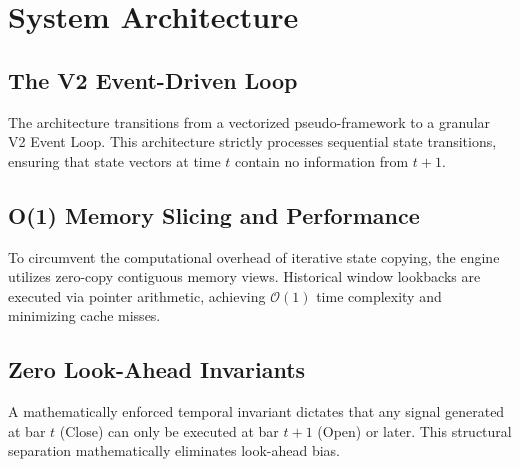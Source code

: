 \chapter{System Architecture}
\section{The V2 Event-Driven Loop}
The architecture transitions from a vectorized pseudo-framework to a granular V2 Event Loop. This architecture strictly processes sequential state transitions, ensuring that state vectors at time $t$ contain no information from $t+1$. 
\section{O(1) Memory Slicing and Performance}
To circumvent the computational overhead of iterative state copying, the engine utilizes zero-copy contiguous memory views. Historical window lookbacks are executed via pointer arithmetic, achieving $\mathcal{O}(1)$ time complexity and minimizing cache misses.
\section{Zero Look-Ahead Invariants}
A mathematically enforced temporal invariant dictates that any signal generated at bar $t$ (Close) can only be executed at bar $t+1$ (Open) or later. This structural separation mathematically eliminates look-ahead bias.

